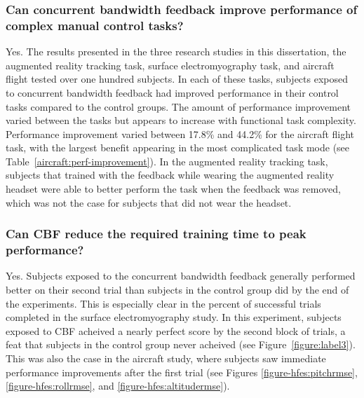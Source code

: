 \subsubsection{Can concurrent bandwidth feedback improve performance of complex manual control tasks?}
Yes.
The results presented in the three research studies in this dissertation, the augmented reality tracking task, surface electromyography task, and aircraft flight tested over one hundred subjects.
In each of these tasks, subjects exposed to concurrent bandwidth feedback had improved performance in their control tasks compared to the control groups.
The amount of performance improvement varied between the tasks but appears to increase with functional task complexity.
Performance improvement varied between 17.8\% and 44.2\% for the aircraft flight task, with the largest benefit appearing in the most complicated task mode (see Table~\ref{aircraft:perf-improvement}).
In the augmented reality tracking task, subjects that trained with the feedback while wearing the augmented reality headset were able to better perform the task when the feedback was removed, which was not the case for subjects that did not wear the headset.

\subsubsection{Can CBF reduce the required training time to peak performance?}
Yes.
Subjects exposed to the concurrent bandwidth feedback generally performed better on their second trial than subjects in the control group did by the end of the experiments.
This is especially clear in the percent of successful trials completed in the surface electromyography study.
In this experiment, subjects exposed to CBF acheived a nearly perfect score by the second block of trials, a feat that subjects in the control group never acheived (see Figure~\ref{figure:label3}).
This was also the case in the aircraft study, where subjects saw immediate performance improvements after the first trial (see Figures \ref{figure-hfes:pitchrmse}, \ref{figure-hfes:rollrmse}, and \ref{figure-hfes:altitudermse}).

